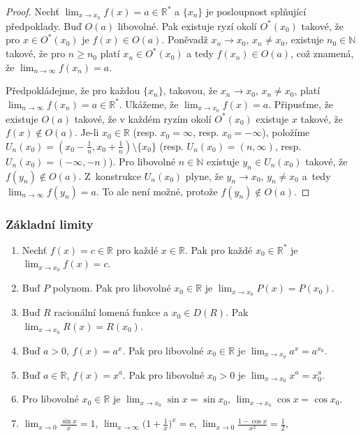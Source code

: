 \documentclass[a4paper,12pt,twoside]{article}
\theoremstyle{definition}
\theoremstyle{remark}
\numberwithin{equation}{section}
\numberwithin{table}{section}
\numberwithin{figure}{section}
\newcommand{\e}{\mathrm{e}}
\newcommand{\R}{\mathbb{R}}
\newcommand{\N}{\mathbb{N}}
\begin{document}
\begin{proof}
\uv{$\Rightarrow$} Nechť $\lim_{x\to x_0}f(x)=a\in\R^\ast$ a $\{x_n\}$ je posloupnost splňující předpoklady. Buď $O(a)$ libovolné. Pak existuje ryzí okolí $O^\ast(x_0)$ takové, že pro $x\in O^\ast(x_0)$ je $f(x)\in O(a)$.
Poněvadž $x_n\to x_0$, $x_n\ne x_0$, existuje $n_0\in\N$ takové, že pro $n\geq n_0$ platí $x_n\in O^*(x_0)$ a tedy
$f(x_n)\in O(a)$, což znamená, že $\lim_{n\to\infty}f(x_n)=a$.

\vskip1mm
\uv{$\Leftarrow$} 
Předpokládejme, že pro každou $\{x_n\}$, takovou, že $x_n\to x_0$, $x_n\ne x_0$, platí 
$\lim_{n\to\infty}f(x_n)= a\in\R^\ast$. Ukážeme, že $\lim_{x\to x_0}f(x)=a$.
Připusťme, že existuje $O(a)$ takové, že v každém ryzím okolí $O^\ast(x_0)$ existuje $x$ takové, že $f(x)\notin O(a)$. Je-li $x_0\in\R$ (resp. $x_0=\infty$, resp. $x_0=-\infty$), položíme $U_n(x_0) =(x_0-\frac{1}{n},x_0+\frac{1}{n})\setminus\{x_0\}$ (resp. $U_n(x_0)=(n,\infty)$, resp. $U_n(x_0)=(-\infty,-n)$). Pro libovolné $n\in\N$ existuje $y_n\in U_n(x_0)$ takové, že $f(y_n)\notin O(a)$. Z~konstrukce $U_n(x_0)$ plyne, že
$y_n\to x_0$, $y_n\ne x_0$ a~tedy $\lim_{n\to\infty}f(y_n)=a$. To ale není 
možné, protože $f(y_n)\notin O(a)$.
\end{proof}

\subsubsection*{Základní limity}
\begin{enumerate}[leftmargin=*]
\item Nechť $f(x)=c\in\R$ pro každé $x\in\R$. Pak pro každé $x_0\in\R^\ast$ je 
$\lim_{x\to x_0}f(x)=c$.
\item Buď $P$ polynom. Pak pro libovolné $x_0\in\R$ je $\lim_{x\to x_0}P(x)=P(x_0)$.
\item Buď $R$ racionální lomená funkce a $x_0\in D(R)$. Pak 
$\lim_{x\to x_0}R(x) = R(x_0)$.
\item Buď $a>0$, $f(x) = a^x$. Pak pro libovolné $x_0\in\R$ je  $\lim_{x\to x_0}
a^x = a^{x_0}$.
\item Buď $a\in\R$, $f(x)=x^a$. Pak pro libovolné $x_0>0$ je $\lim_{x\to x_0}x^a=x^a_0$.
\item Pro libovolné $x_0\in\R$ je $\lim_{x\to x_0}\sin x=\sin x_0$, 
$\lim_{x\to x_0}\cos x=\cos x_0$.
\item $\lim_{x\to 0}\frac{\sin x}{x}=1$, $\lim_{x\to\infty}\bigl(1+\frac{1}{x}\bigr)^x=\e$, $\lim_{x\to 0}\frac{1-\cos x}{x^2}=\frac{1}{2}$, 
\end{enumerate}
\end{document}

